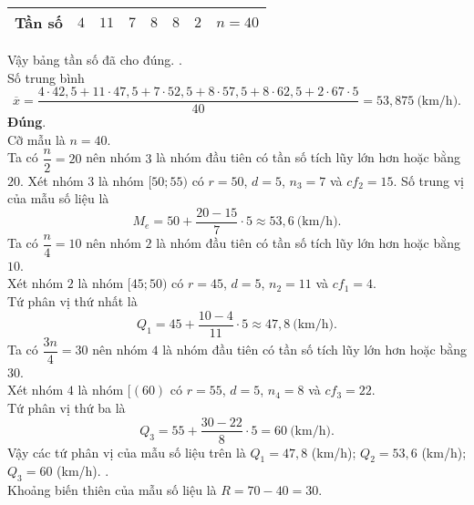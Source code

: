 \begin{ex}
{\begin{itemchoice}
\begin{center}
\begin{tabular}{|c|c|c|c|c|c|c|c|}
 \hline
 Tần số & $4$ & $11$ & $7$ & $8$ & $8$ & $2$ & $n=40$ \\
 \hline
\end{tabular}
\end{center}
Vậy bảng tần số đã cho đúng.
.\\
Số trung bình
\[
\overline x= \dfrac{4\cdot 42{,}5+11\cdot 47{,}5+7\cdot 52{,}5+8\cdot 57{,}5+8\cdot 62{,}5+2\cdot 67 \cdot 5}{40}= 53{,}875~\text{(km/h).}
\]
\itemch \textbf{Đúng}.\\
Cỡ mẫu là $n=40$.\\
Ta có $\dfrac{n}{2}=20$ nên nhóm $3$ là nhóm đầu tiên có tần số tích lũy lớn hơn hoặc bằng $20$.
Xét nhóm $3$ là nhóm $[50;55)$ có $r=50$, $d=5$, $n_3=7$ và $c{f_2}=15$.
Số trung vị của mẫu số liệu là
\[
M_e=50+\dfrac{20-15}{7}\cdot 5\approx 53{,}6 ~\text{(km/h)}.
\]
Ta có $\dfrac{n}{4}=10$ nên nhóm $2$ là nhóm đầu tiên có tần số tích lũy lớn hơn hoặc bằng $10$.\\
Xét nhóm $2$ là nhóm $[45;50)$ có $r=45$, $d=5$, $n_2=11$ và $cf_1=4$.\\
Tứ phân vị thứ nhất là 
\[
Q_1=45+\dfrac{10-4}{11}\cdot 5\approx 47{,}8~\text{(km/h).}\]
Ta có $\dfrac{3n}{4}=30$ nên nhóm $4$ là nhóm đầu tiên có tần số tích lũy lớn hơn hoặc bằng $30$.\\
Xét nhóm $4$ là nhóm $[(60)$ có $r=55$, $d=5$, $n_4=8$ và $c{f_3}=22$.\\
Tứ phân vị thứ ba là
\[ Q_3=55+\dfrac{30-22}{8}\cdot 5=60~\text{(km/h).} \]
Vậy các tứ phân vị của mẫu số liệu trên là
$Q_1=47{,}8$ (km/h); ${Q_2}=53{,}6$ (km/h); $ Q_3 =60$ (km/h).
.\\
Khoảng biến thiên của mẫu số liệu là
$R=70-40=30$.
\end{itemchoice}
}
\end{ex}

